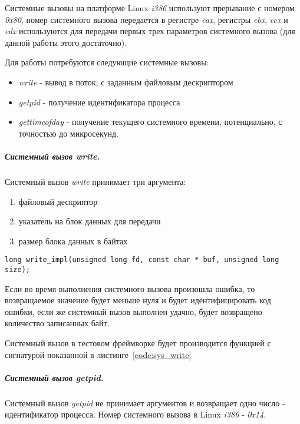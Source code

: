 Системные вызовы на платформе Linux \textit{i386} используют прерывание с номером \textit{0x80}, номер системного вызова передается в регистре \textit{eax}, регистры \textit{ebx}, \textit{ecx} и \textit{edx} используются для передачи первых трех параметров системного вызова (для данной работы этого достаточно).

Для работы потребуются следующие системные вызовы:

\begin{itemize}

    \item \textit{write} - вывод в поток, с заданным файловым дескриптором

    \item \textit{getpid} - получение идентификатора процесса

    \item \textit{gettimeofday} - получение текущего системного времени, потенциально, с точностью до микросекунд.

\end{itemize}

\subparagraph{Системный вызов write.}

Системный вызов \textit{write} принимает три аргумента:

\begin{enumerate}
    \item файловый дескриптор
    \item указатель на блок данных для передачи
    \item размер блока данных в байтах
\end{enumerate}

\begin{lstlisting}[caption=Сигнатура функции write, label=code:sys_write]
long write_impl(unsigned long fd, const char * buf, unsigned long size);
\end{lstlisting}

Если во время выполнения системного вызова произошла ошибка, то возвращаемое значение будет меньше нуля и будет идентифицировать код ошибки, если же системный вызов выполнен удачно, будет возвращено количество записанных байт.

Системный вызов в тестовом фреймворке будет производится функцией с сигнатурой показанной в листинге~\ref{code:sys_write}

\subparagraph{Системный вызов getpid.} Системный вызов \textit{getpid} не принимает аргументов и возвращает одно число - идентификатор процесса. Номер системного вызова в Linux \textit{i386} - \textit{0x14}.

